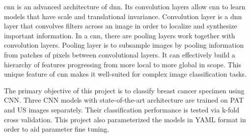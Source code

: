\ac{cnn} is an advanced architecture of \ac{dnn}. Its convolution layers allow \ac{cnn} to learn models that have scale and translational invariance. Convolution layer is a \ac{dnn} layer that convolves filters across an image in order to localize and synthesize important information. In a \ac{cnn}, there are pooling layers work together with convolution layers. Pooling layer is to subsample images by pooling information from patches of pixels between convolutional layers. It can effectively build a hierarchy of features progressing from more local to more global in scope. This unique feature of \ac{cnn} makes it well-suited for complex image classification tasks.

The primary objective of this project is to classify breast cancer specimen using CNN. Three CNN models with state-of-the-art architecture are trained on PAT and US images separately. Their classification performance is tested via k-fold cross validation. This project also parameterized the models in YAML format in order to aid parameter fine tuning.





